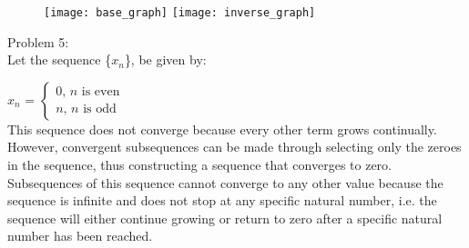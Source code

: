 \documentclass[12pt,leqno]{article}
\begin{document}
\begin{figure}[!h]
\texttt{[image: base\_graph]}
\texttt{[image: inverse\_graph]}

\end{figure}

\bigskip
\noindent Problem 5:\\
\indent Let the sequence \{$x_n$\}, be given by:

\medskip
$x_n$ = $\begin{cases}
	0 \text{, $n$ is even} \\
	n \text{, $n$ is odd}
\end{cases}$\\
This sequence does not converge because every other term grows continually. However, convergent subsequences can be made through selecting only the zeroes in the sequence, thus constructing a sequence that converges to zero. Subsequences of this sequence cannot converge to any other value because the sequence is infinite and does not stop at any specific natural number, i.e. the sequence will either continue growing or return to zero after a specific natural number has been reached.
\end{document}
